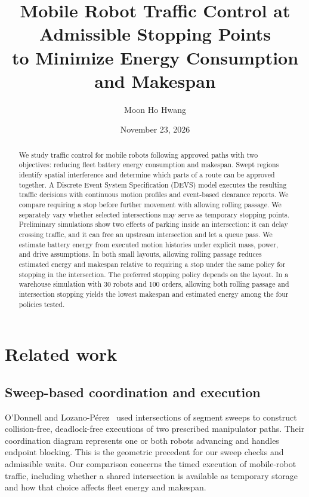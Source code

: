 \documentclass[11pt,a4paper]{article}
\title{Mobile Robot Traffic Control at Admissible Stopping Points\protect\\
to Minimize Energy Consumption and Makespan}
\author{Moon Ho Hwang}
\date{November 23, 2026}
\begin{document}
\maketitle

\begin{abstract}
We study traffic control for mobile robots following approved paths with two
objectives: reducing fleet battery energy consumption and makespan. Swept
regions identify spatial interference and determine which parts of a route
can be approved together. A Discrete Event System Specification (DEVS)
model executes the resulting traffic decisions with continuous motion
profiles and event-based clearance reports. We compare requiring a stop
before further movement with allowing rolling passage. We separately vary whether selected intersections
may serve as temporary stopping points. Preliminary simulations show two
effects of parking inside an intersection: it can delay crossing traffic,
and it can free an upstream intersection and let a queue pass. We estimate
battery energy from executed motion histories under
explicit mass, power, and drive assumptions. In both small layouts,
allowing rolling passage reduces estimated energy and makespan relative to
requiring a stop under the same policy for stopping in the intersection. The preferred stopping policy depends
on the layout. In a warehouse simulation with 30 robots and 100 orders,
allowing both rolling passage and intersection stopping yields the lowest
makespan and estimated energy among the four policies tested.
\end{abstract}

\section{Related work}

\subsection{Sweep-based coordination and execution}
O'Donnell and Lozano-P\'erez~\cite{odonnell1989} used intersections of segment
sweeps to construct collision-free, deadlock-free executions of two prescribed
manipulator paths. Their coordination diagram represents one or both robots
advancing and handles endpoint blocking. This is the geometric precedent for
our sweep checks and admissible waits. Our comparison concerns the timed
execution of mobile-robot traffic, including whether a shared intersection is
available as temporary storage and how that choice affects fleet energy and
makespan.
\end{document}
